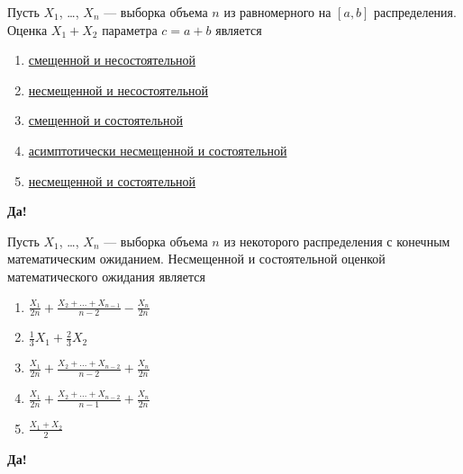 \documentclass[t]{beamer}
\begin{document}
 \begin{frame} \label{32-Yes} 
\begin{block}{32} 

Пусть $X_1$, \ldots, $X_n$ — выборка объема $n$ из равномерного на $[a, b]$ распределения. Оценка $X_1+X_2$ параметра $c=a+b$ является
 


 \end{block} 
\begin{enumerate} 
\item[] \hyperlink{32-No}{\beamergotobutton{} смещенной и несостоятельной}
\item[] \hyperlink{32-Yes}{\beamergotobutton{} несмещенной и несостоятельной}
\item[] \hyperlink{32-No}{\beamergotobutton{} смещенной и состоятельной}
\item[] \hyperlink{32-No}{\beamergotobutton{} асимптотически несмещенной и состоятельной}
\item[] \hyperlink{32-No}{\beamergotobutton{} несмещенной и состоятельной}
\end{enumerate} 

 \textbf{Да!} 
 \hyperlink{33}{}\end{frame} 


 \begin{frame} \label{33-Yes} 
\begin{block}{33} 

Пусть $X_1$, \ldots, $X_n$ — выборка объема $n$ из некоторого распределения с конечным математическим ожиданием. Несмещенной и состоятельной оценкой математического ожидания является
 


 \end{block} 
\begin{enumerate} 
\item[] \hyperlink{33-Yes}{\beamergotobutton{} $\frac{X_1}{2n}+\frac{X_2+\ldots+X_{n-1}}{n-2}-\frac{X_n}{2 n}$}
\item[] \hyperlink{33-No}{\beamergotobutton{} $\frac{1}{3} X_1 + \frac{2}{3} X_2$}
\item[] \hyperlink{33-No}{\beamergotobutton{} $\frac{X_1}{2 n}+\frac{X_2+\ldots+X_{n-2}}{n-2}+\frac{X_n}{2 n}$}
\item[] \hyperlink{33-No}{\beamergotobutton{} $\frac{X_1}{2 n}+\frac{X_2+\ldots+X_{n-2}}{n-1}+\frac{X_n}{2 n}$}
\item[] \hyperlink{33-No}{\beamergotobutton{} $\frac{X_1+X_2}{2}$}
\end{enumerate} 

 \textbf{Да!} 
 \hyperlink{34}{}\end{frame} 
\end{document}

